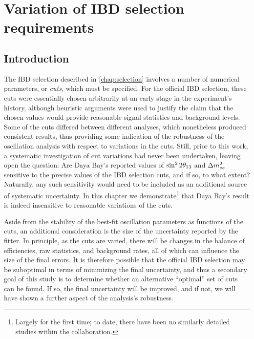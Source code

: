 \documentclass[../thesis.tex]{subfiles}
\begin{document}
\chapter{Variation of IBD selection requirements}
\label{chap:cutVary}

\section{Introduction}
\label{sec:cutVaryIntro}


The IBD selection described in \autoref{chap:selection} involves a number of numerical parameters, or \emph{cuts,} which must be specified. For the official IBD selection, these cuts were essentially chosen arbitrarily at an early stage in the experiment's history, although heuristic arguments were used to justify the claim that the chosen values would provide reasonable signal statistics and background levels. Some of the cuts differed between different analyses, which nonetheless produced consistent results, thus providing some indication of the robustness of the oscillation analysis with respect to variations in the cuts. Still, prior to this work, a systematic investigation of cut variations had never been undertaken, leaving open the question: Are Daya Bay's reported values of $\sin^2 2\theta_{13}$ and $\Delta m^2_{ee}$ sensitive to the precise values of the IBD selection cuts, and if so, to what extent? Naturally, any such sensitivity would need to be included as an additional source of systematic uncertainty. In this chapter we demonstrate\footnote{Largely for the first time; to date, there have been no similarly detailed studies within the collaboration.} that Daya Bay's result is indeed insensitive to reasonable variations of the cuts.

Aside from the stability of the best-fit oscillation parameters as functions of the cuts, an additional consideration is the size of the uncertainty reported by the fitter. In principle, as the cuts are varied, there will be changes in the balance of efficiencies, raw statistics, and background rates, all of which can influence the size of the final errors. It is therefore possible that the official IBD selection may be suboptimal in terms of minimizing the final uncertainty, and thus a secondary goal of this study is to determine whether an alternative ``optimal'' set of cuts can be found. If so, the final uncertainty will be improved, and if not, we will have shown a further aspect of the analysis's robustness.
\end{document}
